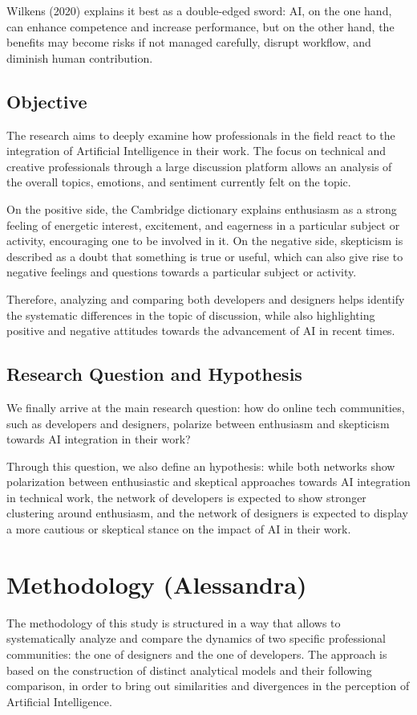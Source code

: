 \documentclass[conference]{IEEEtran}
\begin{document}
Wilkens (2020) \cite{b12} explains it best as a double-edged sword: AI, on the one hand, can enhance competence and increase performance, but on the other hand, the benefits may become risks if not managed carefully, disrupt workflow, and diminish human contribution.

\subsection{Objective}
The research aims to deeply examine how professionals in the field react to the integration of Artificial Intelligence in their work. The focus on technical and creative professionals through a large discussion platform allows an analysis of the overall topics, emotions, and sentiment currently felt on the topic.

On the positive side, the Cambridge dictionary explains enthusiasm as a strong feeling of energetic interest, excitement, and eagerness in a particular subject or activity, encouraging one to be involved in it. On the negative side, skepticism is described as a doubt that something is true or useful, which can also give rise to negative feelings and questions towards a particular subject or activity.

Therefore, analyzing and comparing both developers and designers helps identify the systematic differences in the topic of discussion, while also highlighting positive and negative attitudes towards the advancement of AI in recent times.

\subsection{Research Question and Hypothesis}
We finally arrive at the main research question: how do online tech communities, such as developers and designers, polarize between enthusiasm and skepticism towards AI integration in their work?

Through this question, we also define an hypothesis: while both networks show polarization between enthusiastic and skeptical approaches towards AI integration in technical work, the network of developers is expected to show stronger clustering around enthusiasm, and the network of designers is expected to display a more cautious or skeptical stance on the impact of AI in their work.

\section{Methodology (Alessandra)}
The methodology of this study is structured in a way that allows to systematically analyze and compare the dynamics of two specific professional communities: the one of designers and the one of developers. The approach is based on the construction of distinct analytical models and their following comparison, in order to bring out similarities and divergences in the perception of Artificial Intelligence.
\end{document}
